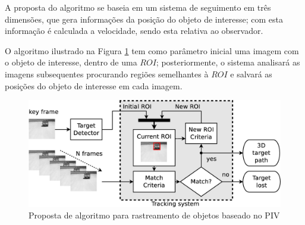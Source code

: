 A proposta do algoritmo se baseia em um sistema de seguimento em três dimensões, que gera informações
da posição do objeto de interesse; com esta informação é calculada a velocidade,
sendo esta relativa ao observador.

O algoritmo ilustrado na Figura \ref{fig:system} tem como parâmetro inicial uma imagem com o
objeto de interesse, dentro de uma $ROI$; posteriormente, 
o sistema analisará as imagens subsequentes procurando regiões semelhantes à $ROI$
e salvará as posições do objeto de interesse em cada imagem.

\begin{figure}[h]
\includegraphics[width=\columnwidth]{images/figure1-diagram1.eps}
\caption{Proposta de algoritmo para rastreamento de objetos baseado no PIV}
\label{fig:system}
\end{figure}

